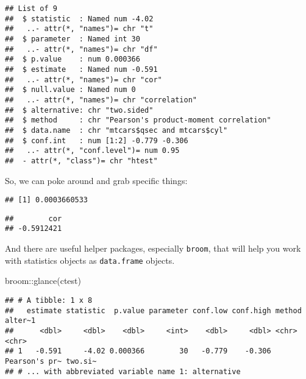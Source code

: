 \documentclass[
]{book}
\newenvironment{Shaded}{\begin{snugshade}}{\end{snugshade}}
\newcommand{\FunctionTok}[1]{\textcolor[rgb]{0.00,0.00,0.00}{#1}}
\newcommand{\NormalTok}[1]{#1}
\newcommand{\SpecialCharTok}[1]{\textcolor[rgb]{0.00,0.00,0.00}{#1}}
\begin{document}
\begin{verbatim}
## List of 9
##  $ statistic  : Named num -4.02
##   ..- attr(*, "names")= chr "t"
##  $ parameter  : Named int 30
##   ..- attr(*, "names")= chr "df"
##  $ p.value    : num 0.000366
##  $ estimate   : Named num -0.591
##   ..- attr(*, "names")= chr "cor"
##  $ null.value : Named num 0
##   ..- attr(*, "names")= chr "correlation"
##  $ alternative: chr "two.sided"
##  $ method     : chr "Pearson's product-moment correlation"
##  $ data.name  : chr "mtcars$qsec and mtcars$cyl"
##  $ conf.int   : num [1:2] -0.779 -0.306
##   ..- attr(*, "conf.level")= num 0.95
##  - attr(*, "class")= chr "htest"
\end{verbatim}

So, we can poke around and grab specific things:

\begin{Shaded}
\end{Shaded}

\begin{verbatim}
## [1] 0.0003660533
\end{verbatim}

\begin{Shaded}
\end{Shaded}

\begin{verbatim}
##        cor 
## -0.5912421
\end{verbatim}

And there are useful helper packages, especially \texttt{broom}, that will help you work with statistics objects as \texttt{data.frame} objects.

\begin{Shaded}
\begin{Highlighting}[]
\NormalTok{broom}\SpecialCharTok{::}\FunctionTok{glance}\NormalTok{(ctest)}
\end{Highlighting}
\end{Shaded}

\begin{verbatim}
## # A tibble: 1 x 8
##   estimate statistic  p.value parameter conf.low conf.high method        alter~1
##      <dbl>     <dbl>    <dbl>     <int>    <dbl>     <dbl> <chr>         <chr>  
## 1   -0.591     -4.02 0.000366        30   -0.779    -0.306 Pearson's pr~ two.si~
## # ... with abbreviated variable name 1: alternative
\end{verbatim}
\end{document}
